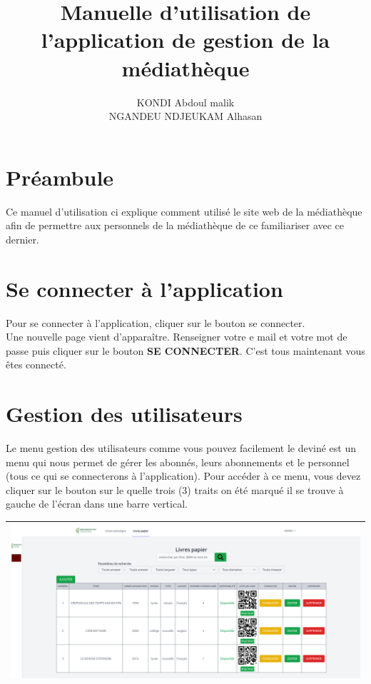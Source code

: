 \documentclass[12pt,a4paper]{article}
\author{KONDI Abdoul malik \\ NGANDEU NDJEUKAM Alhasan}
\title{Manuelle d'utilisation de l'application de gestion de la médiathèque}
\begin{document}
\maketitle
\tableofcontents
\newpage

\section{Préambule}
Ce manuel d'utilisation ci explique comment utilisé le site web de la médiathèque afin
de permettre aux personnels de la médiathèque de ce familiariser avec ce dernier.

\newpage
\section{Se connecter à l'application}
Pour se connecter à l'application, cliquer sur le bouton se connecter.\\
Une nouvelle page vient d'apparaître. Renseigner votre e mail et votre mot de passe 
puis cliquer sur le bouton \textbf{SE CONNECTER}. C'est tous maintenant vous êtes 
connecté.


\newpage
\section{Gestion des utilisateurs}
Le menu gestion des utilisateurs comme vous pouvez facilement le deviné est un menu qui
nous permet de gérer les abonnés, leurs abonnements et le personnel (tous ce qui se
connecterons à l'application). Pour accéder à ce menu, vous devez cliquer sur le bouton sur le
quelle trois (3) traits on été marqué il se trouve à gauche de l'écran dans une barre
vertical. \\

\begin{center}
\begin{tabular}{|p{17cm}|}
\hline 
\includegraphics[width=\textwidth]{img/sidebar.png} \\ 
\hline 
\end{tabular} 
\end{center}
\end{document}
